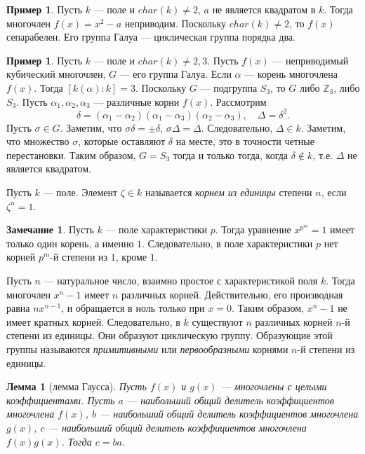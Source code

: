 \documentclass[12pt, titlepage, oneside]{amsbook}
\newcommand{\ZZ}{\mathbb{Z}}
\newtheorem{lemma}[theorem]{Лемма}
\theoremstyle{definition}
\newtheorem{example}[theorem]{Пример}
\newtheorem{remark}[theorem]{Замечание}
\theoremstyle{remark}
\begin{document}
\begin{example}
Пусть $k$ --- поле и $char(k)\neq 2$, $a$ не является квадратом в $k$. Тогда многочлен $f(x)=x^2-a$ неприводим. Поскольку $char(k)\neq 2$, то $f(x)$ сепарабелен. Его группа Галуа --- циклическая группа порядка два.
\end{example}

\begin{example}
Пусть $k$ --- поле и $char(k)\neq 2,3$. Пусть $f(x)$ --- неприводимый кубический многочлен, $G$ --- его группа Галуа. Если $\alpha$ --- корень многочлена $f(x)$. Тогда $[k(\alpha):k]=3$. Поскольку $G$ --- подгруппа $S_3$, то $G$ либо $\ZZ_3$, либо $S_3$. Пусть $\alpha_1,\alpha_2,\alpha_3$ --- различные корни $f(x)$. Рассмотрим $$\delta=(\alpha_1-\alpha_2)(\alpha_1-\alpha_3)(\alpha_2-\alpha_3),\quad \Delta=\delta^2.$$ Пусть $\sigma\in G$. Заметим, что $\sigma \delta=\pm\delta$, $\sigma\Delta=\Delta$. Следовательно, $\Delta\in k$. Заметим, что множество $\sigma$, которые оставляют $\delta$ на месте, это в точности четные перестановки. Таким образом, $G=S_3$ тогда и только тогда, когда $\delta\not\in k$, т.е. $\Delta$ не является квадратом.
\end{example}

Пусть $k$ --- поле. Элемент $\zeta\in k$ называется \emph{корнем из единицы} степени $n$, если $\zeta^n=1$.

\begin{remark}
Пусть $k$ --- поле характеристики $p$. Тогда уравнение $x^{p^m}=1$ имеет только один корень, а именно $1$. Следовательно, в поле характеристики $p$ нет корней $p^m$-й степени из $1$, кроме $1$.
\end{remark}

Пусть $n$ --- натуральное число, взаимно простое с характеристикой поля $k$. Тогда многочлен $x^n-1$ имеет $n$ различных корней. Действительно, его производная равна $nx^{n-1}$, и обращается в ноль только при $x=0$. Таким образом, $x^n-1$ не имеет кратных корней. Следовательно, в $\bar{k}$ существуют $n$ различных корней $n$-й степени из единицы. Они образуют циклическую группу. Образующие этой группы называются \emph{примитивными} или \emph{первообразными} корнями $n$-й степени из единицы.

\begin{lemma}[лемма Гаусса]
\label{Gaus}
Пусть $f(x)$ и $g(x)$ --- многочлены с целыми коэффициентами. Пусть $a$ --- наибольший общий делитель коэффициентов многочлена $f(x)$, $b$ --- наибольший общий делитель коэффициентов многочлена $g(x)$, $c$ --- наибольший общий делитель коэффициентов многочлена $f(x)g(x)$. Тогда $c=ba$.
\end{lemma}
\end{document}

